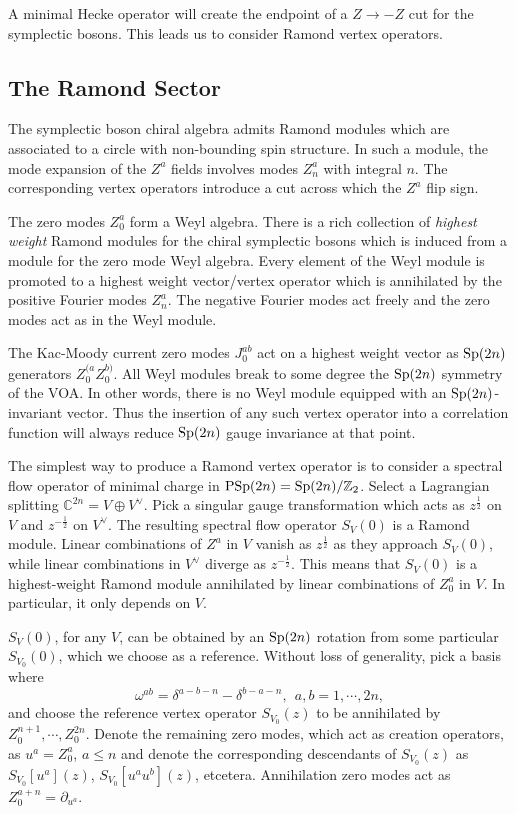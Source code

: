 \documentclass[11pt,a4paper]{article}
\begin{document}
A minimal Hecke operator will create the endpoint of a $Z \to -Z$ cut for the symplectic bosons. This leads us to consider Ramond vertex operators. 

\subsection{The Ramond Sector} \label{sec:Ramond}
The symplectic boson chiral algebra admits Ramond modules which are associated to a circle with 
non-bounding spin structure. In such a module, the mode expansion of the $Z^a$ fields involves modes $Z^a_n$ with integral $n$. 
The corresponding vertex operators introduce a cut across which the $Z^a$ flip sign. 

The zero modes $Z^a_0$ form a Weyl algebra. There is a rich collection of {\it highest weight} Ramond modules for the chiral symplectic bosons which is induced from a module for the zero mode Weyl algebra. Every element of the Weyl module is promoted to a highest weight vector/vertex operator which is annihilated by the positive Fourier modes $Z^a_n$. The negative Fourier modes act freely and the zero modes act as in the Weyl module. 


The Kac-Moody current zero modes $J_0^{ab}$ act on a highest weight vector as ${\mathrm{Sp}}(2n)$ generators $Z^{(a}_0 Z^{b)}_0$. 
All Weyl modules break to some degree the ${\mathrm{Sp}}(2n)$ symmetry of the VOA. In other words, there is no Weyl module 
equipped with an ${\mathrm{Sp}}(2n)$-invariant vector. Thus the insertion of any such vertex operator into a correlation function will always reduce ${\mathrm{Sp}}(2n)$ gauge invariance at that point. 

The simplest way to produce a Ramond vertex operator is to consider a spectral flow operator of minimal charge in ${\mathrm{PSp}}(2n)={\mathrm{Sp}}(2n)/{\mathbb Z}_2$. Select a Lagrangian splitting $\mathbb{C}^{2n} = V \oplus V^\vee$. Pick a singular gauge transformation which acts as $z^{\frac12}$ on $V$ and $z^{-\frac12}$ on $V^\vee$. The resulting spectral flow operator $S_V(0)$ is a Ramond module. Linear combinations of $Z^a$ in $V$ vanish as $z^{\frac12}$ as they approach $S_V(0)$, while linear combinations in $V^\vee$ diverge as $z^{-\frac12}$. This means that $S_V(0)$ is a highest-weight Ramond module annihilated by linear combinations of $Z_0^a$ in $V$. In particular, it only depends on $V$. 

$S_V(0)$, for any $V$, can be obtained by 
 an ${\mathrm{Sp}}(2n)$ rotation from some particular $S_{V_0}(0)$, which we choose as a reference. Without loss of generality, pick a basis where 
\begin{equation}
\omega^{ab} = \delta^{a-b-n}- \delta^{b-a-n},~~a,b=1,\cdots, 2n,\end{equation}
and choose the reference vertex operator $S_{V_0}(z)$ to be annihilated by $Z^{n+1}_0, \cdots, Z^{2n}_0$. 
Denote the remaining zero modes, which act as creation operators, as $u^a=Z_0^a$,  $a\leq n$ and denote the corresponding descendants of $S_{V_0}(z)$ as $S_{V_0}[u^a](z)$, $S_{V_0}[u^a u^b](z)$, etcetera. Annihilation zero modes act as $Z_0^{a+n}=\partial_{u^a}$.
\end{document}
